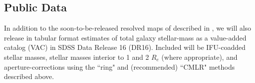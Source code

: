 \subsection{Public Data}

In addition to the soon-to-be-released resolved maps of  described in , we will also release in tabular format estimates of total galaxy stellar-mass as a value-added catalog (VAC) in SDSS Data Release 16 (DR16). Included will be IFU-coadded stellar masses, stellar masses interior to 1 and 2 $R_e$ (where appropriate), and aperture-corrections using the ``ring" and (recommended) ``CMLR" methods described above.